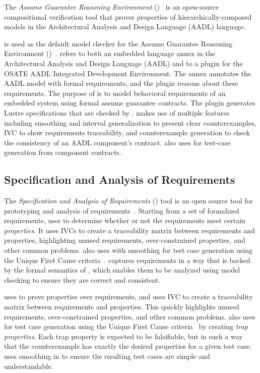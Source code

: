  The {\em Assume Guarantee Reasoning Environment} (\agree)~\cite{cofer2012nfm,QFCS15:backes,hilt2013} is an open-source compositional verification tool that proves properties of hierarchically-composed models in the Architectural Analysis and Design Language (AADL) language.  %
%

\noindent \jkind is used as the default model checker for the Assume
Guarantee Reasoning Environment (\agree)~\cite{cofer2012nfm}. \agree
refers to both an embedded language annex in the Architectural
Analysis and Design Language (AADL) and to a plugin for the OSATE AADL
Integrated Development Environment. The \agree annex annotates the
AADL model with formal requirements, and the plugin reasons about
these requirements. The purpose of \agree is to model behavioral
requirements of an embedded system using formal assume guarantee
contracts. The plugin generates Lustre specifications that are checked
by \jkind.
%
\agree makes use of multiple \jkind features including smoothing and
interval generalization to present clear counterexamples, IVC to show
requirements traceability, and counterexample generation to check the
consistency of an AADL component's contract. \agree also uses \jkind
for test-case generation from component contracts.

\subsection{Specification and Analysis of Requirements}

The {\em Specification and Analysis of Requirements} (\spear) tool is an open source tool for prototyping and analysis of requirements~\cite{fifarek2017nfm}.  Starting from a set of formalized requirements, \spear uses \jkind to determine whether or not the requirements meet certain {\em properties}.  It uses IVCs to create a traceability matrix between requirements and properties, highlighting unused requirements, over-constrained properties, and other common problems. \spear also uses \jkind with smoothing for test case generation using the Unique First Cause criteria~\cite{whalen2006issta}.
%
\spear captures
requirements in a way that is backed by the formal semantics of
\lustre, which enables them to be analyzed using model checking to
ensure they are correct and consistent.

\spear uses \jkind to prove properties over requirements, and uses IVC
to create a traceability matrix between requirements and properties.
This quickly highlights unused requirements, over-constrained
properties, and other common problems. \spear also uses \jkind for
test case generation using the Unique First Cause
criteria~\cite{whalen2006issta} by creating {\em trap properties}.
Each trap property is expected to be falsifiable, but in such a way
that the counterexample has exactly the desired properties for a given
test case. \spear uses smoothing in \jkind to ensure the resulting
test cases are simple and understandable.


